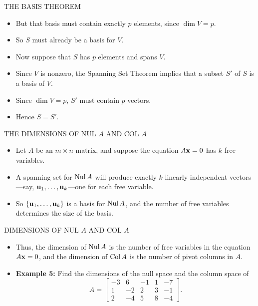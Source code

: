 \begin{frame}{THE BASIS THEOREM}
\begin{itemize}
\item But that basis must contain exactly $p$ elements, since $\dim V=p$.
\item So $S$ must already be a basis for $V$.
\item Now suppose that $S$ has $p$ elements and spans $V$.
\item Since $V$ is nonzero, the Spanning Set Theorem implies that a subset $S'$ of $S$ is a basis of $V$.
\item Since $\dim V=p$, $S'$ must contain $p$ vectors.
\item Hence $S=S'$.
\end{itemize}
\end{frame}

\begin{frame}[shrink=7]{THE DIMENSIONS OF NUL $A$ AND COL $A$}
\begin{itemize}
\item Let $A$ be an $m\times n$ matrix, and suppose the equation $A\mathbf{x}=0$ has $k$ free variables.
\item A spanning set for $\operatorname{Nul} A$ will produce exactly $k$ linearly independent vectors---say, $\mathbf{u}_1,\ldots,\mathbf{u}_k$---one for each free variable.
\item So $\{\mathbf{u}_1,\ldots,\mathbf{u}_k\}$ is a basis for $\operatorname{Nul} A$, and the number of free variables determines the size of the basis.
\end{itemize}
\end{frame}

\begin{frame}[shrink=8]{DIMENSIONS OF NUL $A$ AND COL $A$}
\begin{itemize}
\item Thus, the dimension of $\operatorname{Nul} A$ is the number of free variables in the equation $A\mathbf{x}=0$, and the dimension of $\operatorname{Col} A$ is the number of pivot columns in $A$.
\item \textbf{Example 5:} Find the dimensions of the null space and the column space of
\[
A=\begin{bmatrix}
-3&6&-1&1&-7\\
1&-2&2&3&-1\\
2&-4&5&8&-4
\end{bmatrix}.
\]
\end{itemize}
\end{frame}

